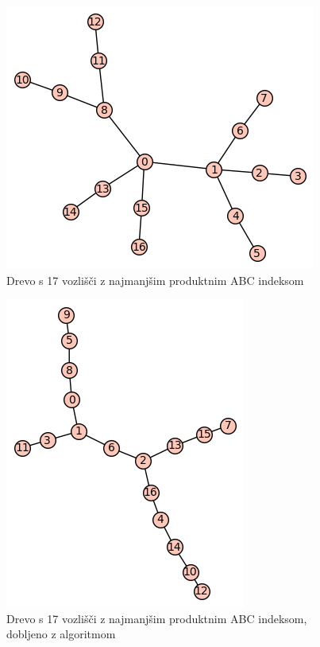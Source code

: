 \documentclass[a4paper,12 pt]{article}
\begin{document}
\begin{figure}
  \includegraphics[width=\linewidth]{Graf_natancno_17.png}
  \caption{Drevo s 17 vozlišči z najmanjšim produktnim ABC indeksom}
  \label{fig:natančno_17}
\end{figure}

\begin{figure}
  \includegraphics[width=\linewidth]{Graf_algo_17.png}
  \caption{Drevo s 17 vozlišči z najmanjšim produktnim ABC indeksom, dobljeno z algoritmom}
  \label{fig:algo_17}
\end{figure}
\end{document}
